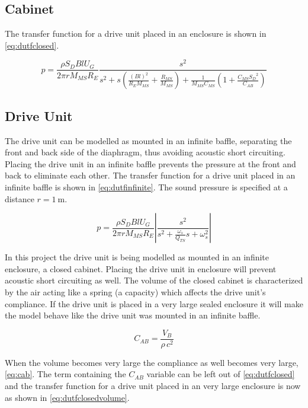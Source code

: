 \subsection{Cabinet}
The transfer function for a drive unit placed in an enclosure is shown in \cref{eq:dutfclosed}.

\begin{equation}
p = \frac{\rho S_D B l U_G}{2\pi r M_{MS} R_E}\frac{s^2}{s^2 +s \left(\frac{(Bl)^2}{R_EM_{MS}}+\frac{R_{MS}}{M_{MS}}\right)+\frac{1}{M_{MS}C_{MS}}\left(1+\frac{C_{MS}{S_D}^2}{C_{AB}}\right)}
\label{eq:dutfclosed}
\end{equation}



\subsection{Drive Unit}
\label{seq:driveunit}
The drive unit can be modelled as mounted in an infinite baffle, separating the front and back side of the diaphragm, thus avoiding acoustic short circuiting. 
Placing the drive unit in an infinite baffle prevents the pressure at the front and back to eliminate each other. \cite[p.~44]{Elektroakustik}  
The transfer function for a drive unit placed in an infinite baffle is shown in \cref{eq:dutfinfinite}.
The sound pressure is specified at a distance $r=\SI{1}{\meter}$.  

\begin{equation}
p = \frac{\rho S_D B l U_G}{2\pi r M_{MS} R_E}\left|\frac{s^2}{s^2 + \frac{\omega_s}{Q_{TS}}s+\omega_s^2}\right|
\label{eq:dutfinfinite}
\end{equation}

In this project the drive unit is being modelled as mounted in an infinite enclosure, a closed cabinet.
Placing the drive unit in enclosure will prevent acoustic short circuiting as well. 
The volume of the closed cabinet is characterized by the air acting like a spring (a capacity) which affects the drive unit's compliance.  
If the drive unit is placed in a very large sealed enclosure it will make the model behave like the drive unit was mounted in an infinite baffle.  

\begin{equation}
C_{AB} = \frac{V_B}{\rho \,c^2}
\label{eq:cab}
\end{equation} 

When the volume becomes very large the compliance as well becomes very large, \cref{eq:cab}. 
The term containing the $C_{AB}$ variable can be left out of \cref{eq:dutfclosed} and the transfer function for a drive unit placed in an very large enclosure is now as shown in \cref{eq:dutfclosedvolume}.

